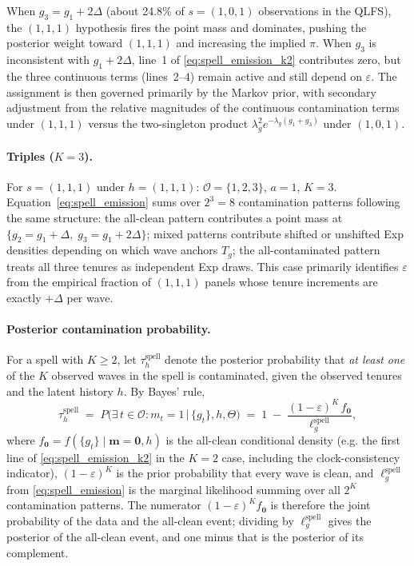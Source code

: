 \documentclass[12pt]{article}
\begin{document}
When \(g_3 = g_1 + 2\Delta\) (about 24.8\% of \(s=(1,0,1)\) observations
in the QLFS), the \((1,1,1)\) hypothesis fires the point mass and
dominates, pushing the posterior weight toward \((1,1,1)\) and increasing
the implied \(\pi\). When \(g_3\) is inconsistent with \(g_1 + 2\Delta\),
line~1 of \eqref{eq:spell_emission_k2} contributes zero, but the three
continuous terms (lines~2--4) remain active and still depend on
\(\varepsilon\). The assignment is then governed primarily by the Markov
prior, with secondary adjustment from the relative magnitudes of the
continuous contamination terms under \((1,1,1)\) versus the two-singleton
product \(\lambda_g^2 e^{-\lambda_g(g_1+g_3)}\) under \((1,0,1)\).

\paragraph{Triples (\(K = 3\)).}
For \(s = (1,1,1)\) under \(h = (1,1,1)\): \(\mathcal{O} = \{1,2,3\}\),
\(a = 1\), \(K = 3\). Equation~\eqref{eq:spell_emission} sums over
\(2^3 = 8\) contamination patterns following the same structure: the
all-clean pattern contributes a point mass at
\(\{g_2 = g_1 + \Delta,\; g_3 = g_1 + 2\Delta\}\); mixed patterns
contribute shifted or unshifted Exp densities depending on which wave
anchors \(T_g\); the all-contaminated pattern treats all three tenures as
independent Exp draws. This case primarily identifies \(\varepsilon\)
from the empirical fraction of \((1,1,1)\) panels whose tenure
increments are exactly \(+\Delta\) per wave.

\paragraph{Posterior contamination probability.}
For a spell with \(K \ge 2\), let
\(\tau_h^{\mathrm{spell}}\) denote the posterior probability that
\emph{at least one} of the \(K\) observed waves in the spell is
contaminated, given the observed tenures and the latent history \(h\).
By Bayes' rule, 
\begin{equation}
\tau_h^{\mathrm{spell}} \;=\;
P\!\big(\exists\, t \in \mathcal{O} : m_t = 1 \,\big|\, \{g_t\}, h, \Theta\big)
\;=\;
1 \;-\; \frac{(1-\varepsilon)^K \, f_{\mathbf{0}}}
             {\ell^{\mathrm{spell}}_g},
\label{eq:tau_spell}
\end{equation}
where \(f_{\mathbf{0}} = f(\{g_t\} \mid \mathbf{m} = \mathbf{0}, h)\) is
the all-clean conditional density (e.g. the first line of
\eqref{eq:spell_emission_k2} in the \(K=2\) case, including the
clock-consistency indicator), \((1-\varepsilon)^K\) is the prior
probability that every wave is clean, and \(\ell^{\mathrm{spell}}_g\)
from \eqref{eq:spell_emission} is the marginal likelihood summing over
all \(2^K\) contamination patterns. The numerator
\((1-\varepsilon)^K f_{\mathbf{0}}\) is therefore the joint probability
of the data and the all-clean event; dividing by
\(\ell^{\mathrm{spell}}_g\) gives the posterior of the all-clean event,
and one minus that is the posterior of its complement.
\end{document}
